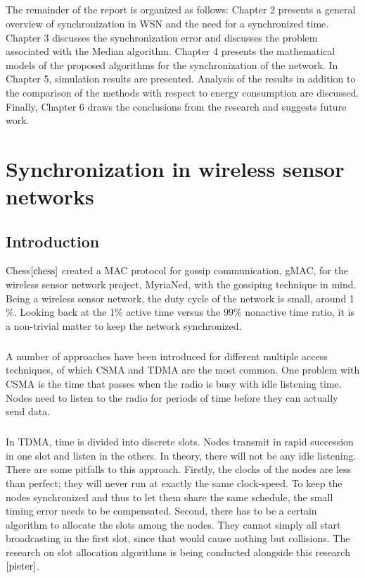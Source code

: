 \documentclass[a4paper,10pt]{report}
\begin{document}
\paragraph*{} The remainder of the report is organized as follows:
Chapter 2 presents a general overview of synchronization in WSN and
the need for a synchronized time. Chapter 3 discusses the
synchronization error and discusses the problem associated with the
Median algorithm. Chapter 4 presents the mathematical models of the
proposed algorithms for the synchronization of the network. In
Chapter 5, simulation results are presented. Analysis of the results
in addition to the comparison of the methods with respect to energy
consumption are discussed. Finally, Chapter 6 draws the conclusions
from the research and suggests future work.
\chapter{\textbf{Synchronization in wireless sensor networks}}
\section{\textbf{Introduction}}
Chess$\cite{chess}$ created a MAC protocol for gossip communication,
gMAC, for the wireless sensor network project, MyriaNed, with the
gossiping technique in mind. Being a wireless sensor network, the
duty cycle of the network is small, around 1$\%$. Looking back at
the 1$\%$ active time versus the $99\%$ nonactive time ratio, it is
a non-trivial matter to keep the network synchronized.
\paragraph*{}
A number of approaches have been introduced for different multiple
access techniques, of which CSMA  and TDMA are the most common. One problem with CSMA
is the time that passes when the radio is busy with idle listening
time. Nodes need to listen to the radio for periods of time before
they can actually send data.
\paragraph*{}
In TDMA, time is divided into discrete slots. Nodes transmit in
rapid succession in one slot and listen in the others. In theory,
there will not be any idle listening. There are some pitfalls to
this approach. Firstly, the clocks of the nodes are less than
perfect; they will never run at exactly the same clock-speed. To
keep the nodes synchronized and thus to let them share the same
schedule, the small timing error needs to be compensated. Second,
there has to be a certain algorithm to allocate the slots among the
nodes. They cannot simply all start broadcasting in the first slot,
since that would cause nothing but collisions. The research on slot
allocation algorithms is being conducted alongside this
research$\cite{pieter}$.
\end{document}
